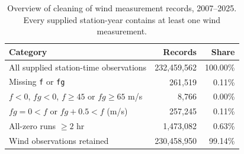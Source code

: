 \begin{table}[htbp]
\centering
\small
\caption[Overview of cleaning of wind measurement records, 2007--2025.]{Overview of cleaning of wind measurement records, 2007--2025. Every supplied station-year contains at least one wind measurement.}
\label{tab:weather-cleaning}
\begin{tabular}{lrr}
\toprule
Category & Records & Share \\
\midrule
All supplied station-time observations & 232,459,562 & 100.00\% \\ \grayhline
Missing \texttt{f} or \texttt{fg} & 261,519 & 0.11\% \\ \grayhline
$f<0$, $fg<0$, $f\geq45$ or $fg\geq65$ m/s & 8,766 & 0.00\% \\ \grayhline
$fg=0<f$ or $fg+0.5<f$ (m/s) & 257,245 & 0.11\% \\ \grayhline
All-zero runs $\geq 2$ hr & 1,473,082 & 0.63\% \\ \midrule
Wind observations retained & 230,458,950 & 99.14\% \\
\bottomrule
\end{tabular}
\end{table}
